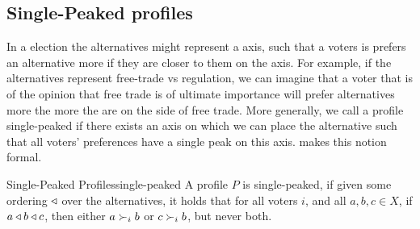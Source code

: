 \subsection{Single-Peaked profiles}
\label{sec: Single-peaked}

In a election the alternatives might represent a axis, such that a voters is prefers an alternative more if they are closer to them on the axis. For example, if the alternatives represent free-trade vs regulation, we can imagine that a voter that is of the opinion that free trade is of ultimate importance will prefer alternatives more the more the are on the side of free trade. More generally, we call a profile single-peaked if there exists an axis on which we can place the alternative such that all voters' preferences have a single peak on this axis.  makes this notion formal.

\begin{definition}{Single-Peaked Profiles}{single-peaked}
	A profile $P$ is single-peaked, if given some ordering $\triangleleft$ over the alternatives, it holds that for all voters $i$, and all $a, b, c \in X$, if $a \triangleleft b \triangleleft c$, then either $a \succ_i b$ or $c \succ_i b$, but never both.
\end{definition}




